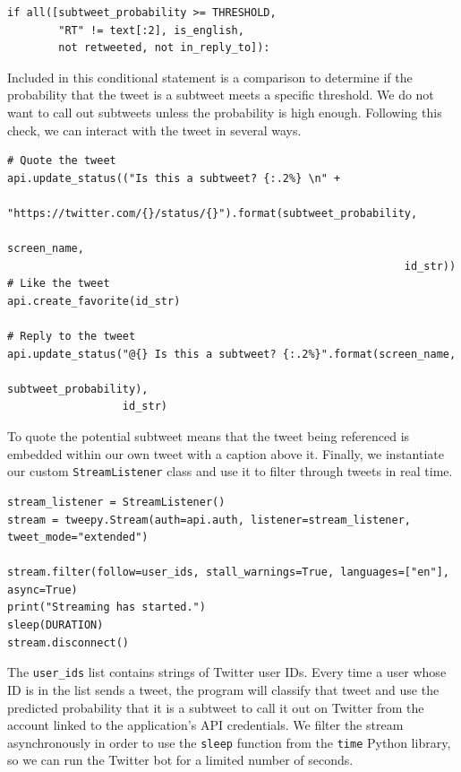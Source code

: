 \documentclass[11pt, twoside, reqno]{book}
\begin{document}
\begin{verbatim}
if all([subtweet_probability >= THRESHOLD,
        "RT" != text[:2], is_english, 
        not retweeted, not in_reply_to]):
\end{verbatim} 

\noindent
Included in this conditional statement is a comparison to determine if the probability that the tweet is a subtweet meets a specific threshold. We do not want to call out subtweets unless the probability is high enough. Following this check, we can interact with the tweet in several ways.

\begin{verbatim}
# Quote the tweet
api.update_status(("Is this a subtweet? {:.2%} \n" + 
                   "https://twitter.com/{}/status/{}").format(subtweet_probability, 
                                                              screen_name, 
                                                              id_str))
# Like the tweet
api.create_favorite(id_str)

# Reply to the tweet
api.update_status("@{} Is this a subtweet? {:.2%}".format(screen_name, 
                                                          subtweet_probability), 
                  id_str)
\end{verbatim}

\noindent
To quote the potential subtweet means that the tweet being referenced is embedded within our own tweet with a caption above it. Finally, we instantiate our custom \verb|StreamListener| class and use it to filter through tweets in real time.

\begin{verbatim}
stream_listener = StreamListener()
stream = tweepy.Stream(auth=api.auth, listener=stream_listener, tweet_mode="extended")

stream.filter(follow=user_ids, stall_warnings=True, languages=["en"], async=True)
print("Streaming has started.")
sleep(DURATION)
stream.disconnect()
\end{verbatim}

\noindent
The \verb|user_ids| list contains strings of Twitter user IDs. Every time a user whose ID is in the list sends a tweet, the program will classify that tweet and use the predicted probability that it is a subtweet to call it out on Twitter from the account linked to the application's API credentials. We filter the stream asynchronously in order to use the \verb|sleep| function from the \verb|time| Python library, so we can run the Twitter bot for a limited number of seconds.
\end{document}
